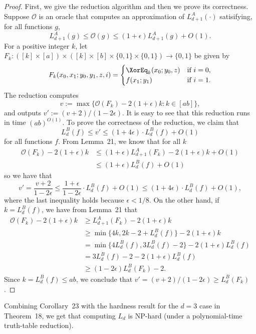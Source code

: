 \begin{proof}
First, we give the reduction algorithm and then we prove its correctness. Suppose $\mathcal O$ is an oracle that computes an approximation of $L_{d+1}^A(\cdot)$ satisifying, for all functions $g$,
\[L_{d+1}^A(g)\le\mathcal O(g)\le(1+\epsilon)L_{d+1}^A(g)+O(1).\]
For a positive integer $k$, let $F_k:([k]\times[a])\times([k]\times[b]\times\{0,1\}\times\{0,1\})\to\{0,1\}$ be given by
\[F_k(x_0,x_1;y_0,y_1,z,i)=\begin{cases}\XorEq_k(x_0;y_0,z)&\text{if }i=0,\\f(x_1;y_1)&\text{if }i=1.\end{cases}\]
The reduction computes
\[v:=\max\{\mathcal O(F_k)-2(1+\epsilon)k:k\in[ab]\},\]
and outputs $v':=(v+2)/(1-2\epsilon)$. It is easy to see that this reduction runs in time $(ab)^{O(1)}$.
To prove the correctness of the reduction, we claim that
\[L_d^B(f)\le v'\le(1+4\epsilon)\cdot L_d^B(f)+O(1)\]
for all functions $f$.
From Lemma~21, we know that for all $k$
\begin{align*}
\mathcal O(F_k)-2(1+\epsilon)k
&\le(1+\epsilon)L_{d+1}^A(F_k)-2(1+\epsilon)k+O(1)\\
&\le(1+\epsilon)L_d^B(f)+O(1)
\end{align*}
so we have that
\[v'=\frac{v+2}{1-2\epsilon}\le\frac{1+\epsilon}{1-2\epsilon}\cdot L_d^B(f)+O(1)\le(1+4\epsilon)\cdot L_d^B(f)+O(1),\]
where the last inequality holds because $\epsilon<1/8$.
On the other hand, if $k=L_d^B(f)$, we have from Lemma~21 that
\begin{align*}
\mathcal O(F_k)-2(1+\epsilon)k
&\ge L_{d+1}^A(F_k)-2(1+\epsilon)k\\
&\ge\min\{4k,2k-2+L_d^B(f)\}-2(1+\epsilon)k\\
&=\min\{4L_d^B(f),3L_d^B(f)-2\}-2(1+\epsilon)L_d^B(f)\\
&=3L_d^B(f)-2-2(1+\epsilon)L_d^B(f)\\
&\ge(1-2\epsilon)L_d^B(F_k)-2.
\end{align*}
Since $k=L_d^B(f)\le ab$, we conclude that $v'=(v+2)/(1-2\epsilon)\ge L_d^B(F_k)$.
\end{proof}
Combining Corollary~23 with the hardness result for the $d=3$ case in Theorem~18, we get that computing $L_d$ is NP-hard (under a polynomial-time truth-table reduction).
